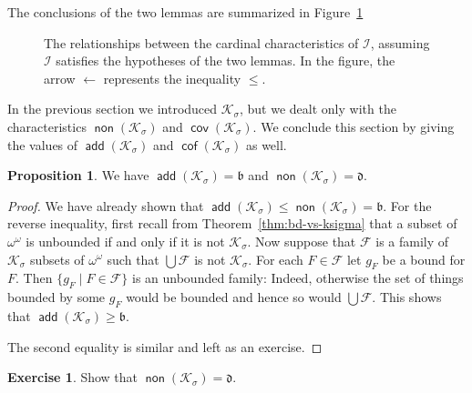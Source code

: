 \documentclass[11pt,oneside]{amsart}
\DeclareMathOperator{\add}{\mathsf{add}}
\DeclareMathOperator{\non}{\mathsf{non}}
\DeclareMathOperator{\cov}{\mathsf{cov}}
\DeclareMathOperator{\cof}{\mathsf{cof}}
\theoremstyle{definition}
\newtheorem{exerc}{Exercise}[section]
\newtheorem{prop}[thm]{Proposition}
\theoremstyle{definition}
\theoremstyle{remark}
\begin{document}
The conclusions of the two lemmas are summarized in Figure~\ref{fig:ideal}

\begin{figure}[h]
  \caption{The relationships between the cardinal characteristics of $\mathcal I$, assuming $\mathcal I$ satisfies the hypotheses of the two lemmas. In the figure, the arrow $\leftarrow$ represents the inequality $\leq$.\label{fig:ideal}}
\end{figure}

In the previous section we introduced $\mathcal K_\sigma$, but we dealt only with the characteristics $\non(\mathcal K_\sigma)$ and $\cov(\mathcal K_\sigma)$. We conclude this section by giving the values of $\add(\mathcal K_\sigma)$ and $\cof(\mathcal K_\sigma)$ as well.

\begin{prop}
  We have $\add(\mathcal K_\sigma)=\mathfrak b$ and $\non(\mathcal K_\sigma)=\mathfrak d$.
\end{prop}

\begin{proof}
  We have already shown that $\add(\mathcal K_\sigma)\leq\non(\mathcal K_\sigma)=\mathfrak b$. For the reverse inequality, first recall from Theorem~\ref{thm:bd-vs-ksigma} that a subset of $\omega^\omega$ is unbounded if and only if it is not $\mathcal K_\sigma$. Now suppose that $\mathcal F$ is a family of $\mathcal K_\sigma$ subsets of $\omega^\omega$ such that $\bigcup\mathcal F$ is not $\mathcal K_\sigma$. For each $F\in\mathcal F$ let $g_F$ be a bound for $F$. Then $\{g_F\mid F\in\mathcal F\}$ is an unbounded family: Indeed, otherwise the set of things bounded by some $g_F$ would be bounded and hence so would $\bigcup\mathcal F$. This shows that $\add(\mathcal K_\sigma)\geq\mathfrak b$.

The second equality is similar and left as an exercise.
\end{proof}

\begin{exerc}
  Show that $\non(\mathcal K_\sigma)=\mathfrak d$.
\end{exerc}
\end{document}

